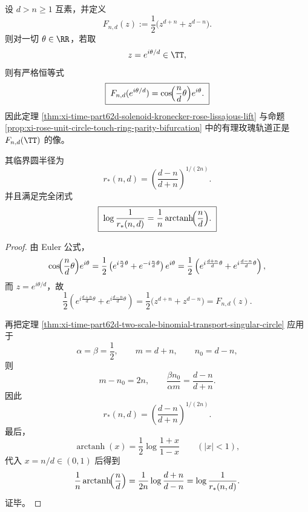 \begin{corollary}[有理玫瑰轨道的二项式输运实现与隐藏临界圆半径]\label{cor:xi-time-part62d-rose-binomial-transport-hidden-radius}
设 \(d>n\ge 1\) 互素，并定义
\[
F_{n,d}(z):=\frac12\bigl(z^{d+n}+z^{d-n}\bigr).
\]
则对一切 \(\theta\in\RR\)，若取
\[
z=e^{i\theta/d}\in\TT,
\]
则有严格恒等式
\[
\boxed{\;
F_{n,d}(e^{i\theta/d})
=
\cos\!\Bigl(\frac{n}{d}\theta\Bigr)e^{i\theta}.\;}
\]
因此定理 \ref{thm:xi-time-part62d-solenoid-kronecker-rose-lissajous-lift} 与命题 \ref{prop:xi-rose-unit-circle-touch-ring-parity-bifurcation} 中的有理玫瑰轨道正是 \(F_{n,d}(\TT)\) 的像。

其临界圆半径为
\[
\boxed{\;
r_\ast(n,d)=
\left(\frac{d-n}{d+n}\right)^{1/(2n)}.\;}
\]
并且满足完全闭式
\[
\boxed{\;
\log\frac{1}{r_\ast(n,d)}
=
\frac{1}{n}\operatorname{arctanh}\!\Bigl(\frac{n}{d}\Bigr).\;}
\]
\end{corollary}
\begin{proof}
由 Euler 公式，
\[
\cos\!\Bigl(\frac{n}{d}\theta\Bigr)e^{i\theta}
=
\frac12
\left(
e^{i\frac{n}{d}\theta}+e^{-i\frac{n}{d}\theta}
\right)e^{i\theta}
=
\frac12
\left(
e^{i\frac{d+n}{d}\theta}+e^{i\frac{d-n}{d}\theta}
\right),
\]
而 \(z=e^{i\theta/d}\)，故
\[
\frac12
\left(
e^{i\frac{d+n}{d}\theta}+e^{i\frac{d-n}{d}\theta}
\right)
=
\frac12\bigl(z^{d+n}+z^{d-n}\bigr)
=
F_{n,d}(z).
\]

再把定理 \ref{thm:xi-time-part62d-two-scale-binomial-transport-singular-circle} 应用于
\[
\alpha=\beta=\frac12,
\qquad
m=d+n,
\qquad
n_0=d-n,
\]
则
\[
m-n_0=2n,
\qquad
\frac{\beta n_0}{\alpha m}=\frac{d-n}{d+n}.
\]
因此
\[
r_\ast(n,d)
=
\left(\frac{d-n}{d+n}\right)^{1/(2n)}.
\]
最后，
\[
\operatorname{arctanh}(x)=\frac12\log\frac{1+x}{1-x}
\qquad(|x|<1),
\]
代入 \(x=n/d\in(0,1)\) 后得到
\[
\frac{1}{n}\operatorname{arctanh}\!\Bigl(\frac{n}{d}\Bigr)
=
\frac{1}{2n}\log\frac{d+n}{d-n}
=
\log\frac{1}{r_\ast(n,d)}.
\]
证毕。
\end{proof}

